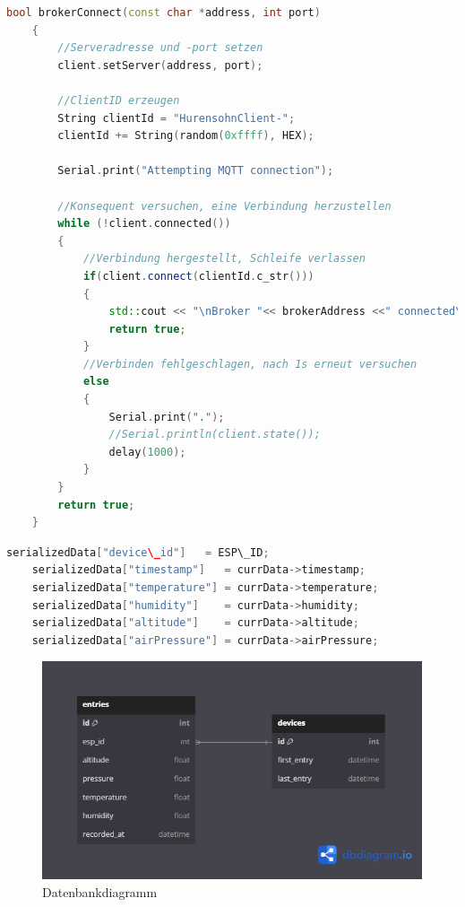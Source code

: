 \begin{lstlisting}[language=C++,caption={MQTT Connect}, label=lst:mqttconnect]
	bool brokerConnect(const char *address, int port)
	{
		//Serveradresse und -port setzen
		client.setServer(address, port);
		
		//ClientID erzeugen
		String clientId = "HurensohnClient-";
		clientId += String(random(0xffff), HEX);
		
		Serial.print("Attempting MQTT connection");
		
		//Konsequent versuchen, eine Verbindung herzustellen
		while (!client.connected()) 
		{
			//Verbindung hergestellt, Schleife verlassen
			if(client.connect(clientId.c_str()))
			{
				std::cout << "\nBroker "<< brokerAddress <<" connected\n" << std::endl;
				return true;
			}
			//Verbinden fehlgeschlagen, nach 1s erneut versuchen
			else
			{
				Serial.print(".");
				//Serial.println(client.state());
				delay(1000);
			}
		}
		return true;
	}
\end{lstlisting}

\begin{lstlisting}[language=C++,caption={Write Json}, label=lst:writejson]
	serializedData["device\_id"]   = ESP\_ID;
	serializedData["timestamp"]   = currData->timestamp;
	serializedData["temperature"] = currData->temperature;
	serializedData["humidity"]    = currData->humidity;
	serializedData["altitude"]    = currData->altitude;
	serializedData["airPressure"] = currData->airPressure;
\end{lstlisting}

\begin{figure}[H]
	\centering
	\includegraphics[width=15cm]{images/db_diagram.png}
	\caption{Datenbankdiagramm}
	\label{fig:db_diagram}
\end{figure}

